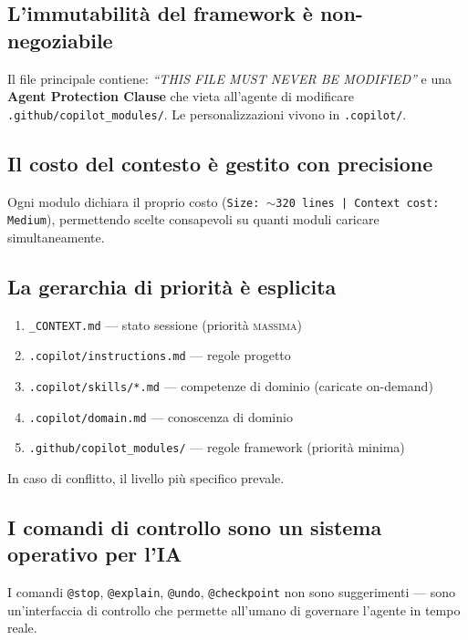 \subsection{L'immutabilità del framework è non-negoziabile}

Il file principale contiene: \textit{``THIS FILE MUST NEVER BE MODIFIED''} e una \textbf{Agent Protection Clause} che vieta all'agente di modificare \texttt{.github/copilot\_modules/}. Le personalizzazioni vivono in \texttt{.copilot/}.

\subsection{Il costo del contesto è gestito con precisione}

Ogni modulo dichiara il proprio costo (\texttt{Size: $\sim$320 lines | Context cost: Medium}), permettendo scelte consapevoli su quanti moduli caricare simultaneamente.

\subsection{La gerarchia di priorità è esplicita}

\begin{enumerate}
  \item \texttt{\_CONTEXT.md} --- stato sessione (priorità \textsc{massima})
  \item \texttt{.copilot/instructions.md} --- regole progetto
  \item \texttt{.copilot/skills/*.md} --- competenze di dominio (caricate on-demand)
  \item \texttt{.copilot/domain.md} --- conoscenza di dominio
  \item \texttt{.github/copilot\_modules/} --- regole framework (priorità minima)
\end{enumerate}

In caso di conflitto, il livello più specifico prevale.

\subsection{I comandi di controllo sono un sistema operativo per l'IA}

I comandi \texttt{@stop}, \texttt{@explain}, \texttt{@undo}, \texttt{@checkpoint} non sono suggerimenti --- sono un'interfaccia di controllo che permette all'umano di governare l'agente in tempo reale.

